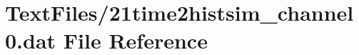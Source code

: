 \hypertarget{21time2histsim__channel0_8dat}{}\section{Text\+Files/21time2histsim\+\_\+channel0.dat File Reference}
\label{21time2histsim__channel0_8dat}
